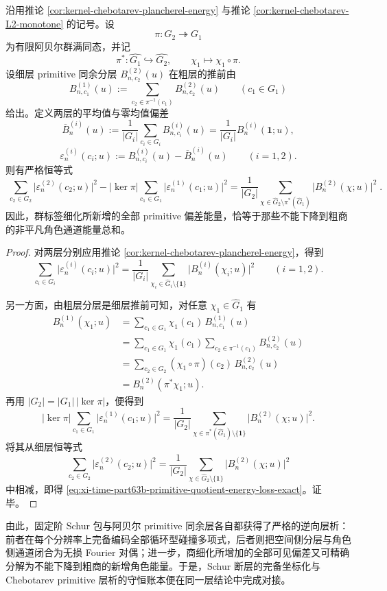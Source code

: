 \begin{theorem}\label{thm:xi-time-part63b-primitive-quotient-energy-loss-exact}
沿用推论 \ref{cor:kernel-chebotarev-plancherel-energy} 与推论 \ref{cor:kernel-chebotarev-L2-monotone} 的记号。设
\[
\pi:G_2\twoheadrightarrow G_1
\]
为有限阿贝尔群满同态，并记
\[
\pi^\ast:\widehat{G_1}\hookrightarrow \widehat{G_2},
\qquad
\chi_1\longmapsto \chi_1\circ\pi.
\]
设细层 primitive 同余分层 \(B_{n,c_2}^{(2)}(u)\) 在粗层的推前由
\[
B_{n,c_1}^{(1)}(u):=\sum_{c_2\in\pi^{-1}(c_1)}B_{n,c_2}^{(2)}(u)
\qquad(c_1\in G_1)
\]
给出。定义两层的平均值与零均值偏差
\[
\overline B_n^{(i)}(u)
:=
\frac{1}{|G_i|}\sum_{c_i\in G_i}B_{n,c_i}^{(i)}(u)
=
\frac{1}{|G_i|}B_n^{(i)}(\mathbf 1;u),
\]
\[
\varepsilon_n^{(i)}(c_i;u)
:=
B_{n,c_i}^{(i)}(u)-\overline B_n^{(i)}(u)
\qquad(i=1,2).
\]
则有严格恒等式
\begin{equation}\label{eq:xi-time-part63b-primitive-quotient-energy-loss-exact}
\boxed{\;
\sum_{c_2\in G_2}\bigl|\varepsilon_n^{(2)}(c_2;u)\bigr|^2
-
|\ker\pi|
\sum_{c_1\in G_1}\bigl|\varepsilon_n^{(1)}(c_1;u)\bigr|^2
=
\frac{1}{|G_2|}
\sum_{\chi\in \widehat G_2\setminus \pi^\ast(\widehat G_1)}
\bigl|B_n^{(2)}(\chi;u)\bigr|^2\; }.
\end{equation}
因此，群标签细化所新增的全部 primitive 偏差能量，恰等于那些不能下降到粗商的非平凡角色通道能量总和。
\end{theorem}
\begin{proof}
对两层分别应用推论 \ref{cor:kernel-chebotarev-plancherel-energy}，得到
\[
\sum_{c_i\in G_i}\bigl|\varepsilon_n^{(i)}(c_i;u)\bigr|^2
=
\frac{1}{|G_i|}
\sum_{\chi_i\in\widehat G_i\setminus\{\mathbf 1\}}
\bigl|B_n^{(i)}(\chi_i;u)\bigr|^2
\qquad(i=1,2).
\]

另一方面，由粗层分层是细层推前可知，对任意 \(\chi_1\in\widehat G_1\) 有
\[
\begin{aligned}
B_n^{(1)}(\chi_1;u)
&=
\sum_{c_1\in G_1}\chi_1(c_1)\,B_{n,c_1}^{(1)}(u)\\
&=
\sum_{c_1\in G_1}\chi_1(c_1)
\sum_{c_2\in\pi^{-1}(c_1)}B_{n,c_2}^{(2)}(u)\\
&=
\sum_{c_2\in G_2}(\chi_1\circ\pi)(c_2)\,B_{n,c_2}^{(2)}(u)\\
&=
B_n^{(2)}(\pi^\ast\chi_1;u).
\end{aligned}
\]
再用 \(|G_2|=|G_1|\,|\ker\pi|\)，便得到
\[
|\ker\pi|
\sum_{c_1\in G_1}\bigl|\varepsilon_n^{(1)}(c_1;u)\bigr|^2
=
\frac{1}{|G_2|}
\sum_{\chi\in \pi^\ast(\widehat G_1)\setminus\{\mathbf 1\}}
\bigl|B_n^{(2)}(\chi;u)\bigr|^2.
\]
将其从细层恒等式
\[
\sum_{c_2\in G_2}\bigl|\varepsilon_n^{(2)}(c_2;u)\bigr|^2
=
\frac{1}{|G_2|}
\sum_{\chi\in \widehat G_2\setminus\{\mathbf 1\}}
\bigl|B_n^{(2)}(\chi;u)\bigr|^2
\]
中相减，即得
\eqref{eq:xi-time-part63b-primitive-quotient-energy-loss-exact}。证毕。
\end{proof}

\noindent
由此，固定阶 Schur 包与阿贝尔 primitive 同余层各自都获得了严格的逆向层析：前者在每个分辨率上完备编码全部循环型碰撞多项式，后者则把空间侧分层与角色侧通道闭合为无损 Fourier 对偶；进一步，商细化所增加的全部可见偏差又可精确分解为不能下降到粗商的新增角色能量。于是，Schur 断层的完备坐标化与 Chebotarev primitive 层析的守恒账本便在同一层结论中完成对接。

\endinput
